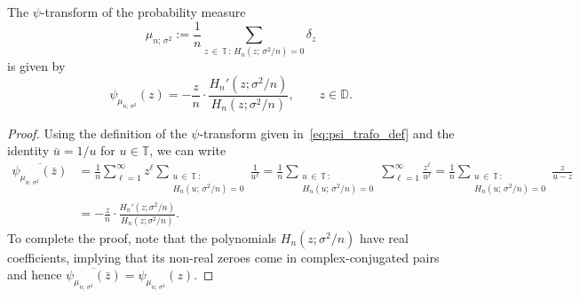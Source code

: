 \documentclass[AHL,Unicode,longabstracts,published]{cedram}
\newcommand{\bT}{\mathbb{T}}
\newcommand{\bD}{\mathbb{D}}
\begin{document}
\begin{lemm}\label{lem:psi_mu_n_sigma^2}
The $\psi$-transform of the probability measure
\[
\mu_{n;\,\sigma^2}:=\frac 1n \sum_{z\,\in\,\bT\,:\, H_n\left(z;\,\sigma^2/n\right) = 0} \delta_z 
\]
is given by
\[
\psi_{\mu_{n;\,\sigma^2}}(z) = -\frac z n \cdot \frac{H_n'\left(z; \sigma^2/n\right)}{H_n\left(z;\sigma^2/n\right)},
\qquad z\in \bD.
\]
\end{lemm}
\begin{proof}
Using the definition of the $\psi$-transform given in~\eqref{eq:psi_trafo_def} and the identity $\bar u = 1/u$ for $u\in \bT$, we can write
\begin{align*}
\overline{\psi_{\mu_{n;\,\sigma^2}}(\bar z)} &=
\frac 1 n \sum_{\ell=1}^\infty z^\ell \sum_{\substack{u\,\in\,\bT\,:\\ H_n\left(u;\,\sigma^2/n\right) = 0}} \frac 1 {u^\ell} =
\frac 1 n \sum_{\substack{u\,\in\,\bT\,:\\ H_n\left(u;\,\sigma^2/n\right) = 0}} \sum_{\ell=1}^\infty \frac {z^\ell} {u^\ell} =
\frac 1 n \sum_{\substack{u\,\in\,\bT\,:\\ H_n\left(u;\,\sigma^2/n\right) = 0}} \frac{z}{u-z}
\\
&= -\frac z n \cdot \frac{H_n'\left(z; \sigma^2/n\right)}{H_n(z;\sigma^2/n)}.
\end{align*}
To complete the proof, note that the polynomials $H_n(z; \sigma^2/n)$ have real coefficients, implying that its non-real zeroes come in complex-conjugated pairs and hence $\overline{\psi_{\mu_{n;\,\sigma^2}}(\bar z)} = \psi_{\mu_{n;\,\sigma^2}}(z)$.
\end{proof}
\end{document}
